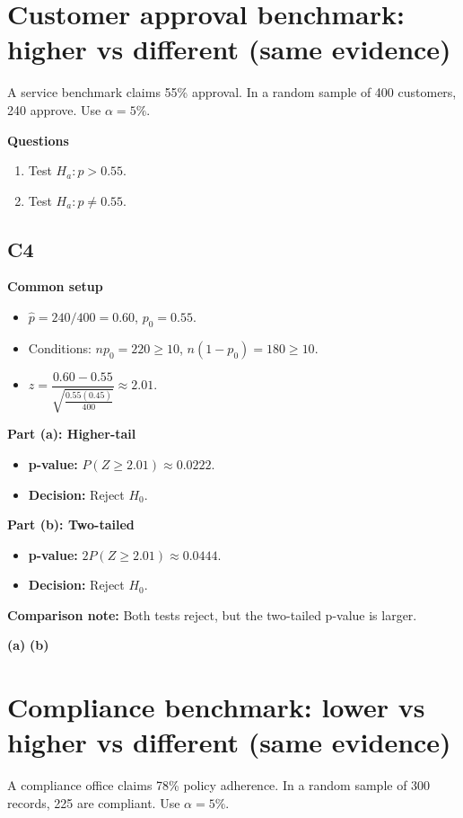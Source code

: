 \section{Customer approval benchmark: higher vs different (same evidence)}
A service benchmark claims 55\% approval. In a random sample of 400 customers, 240 approve. Use \(\alpha=5\%\).

\textbf{Questions}
\begin{enumerate}
    \item[(a)] Test \(H_a\colon p>0.55\).
    \item[(b)] Test \(H_a\colon p\ne0.55\).
\end{enumerate}

\subsection*{C4}
\textbf{Common setup}
\begin{itemize}
    \item \(\hat p=240/400=0.60\), \(p_0=0.55\).
    \item Conditions: \(np_0=220\ge10\), \(n(1-p_0)=180\ge10\).
    \item \(z=\dfrac{0.60-0.55}{\sqrt{\frac{0.55(0.45)}{400}}}\approx 2.01\).
\end{itemize}

\textbf{Part (a): Higher-tail}
\begin{itemize}
    \item \textbf{p-value:} \(P(Z\ge 2.01)\approx 0.0222\).
    \item \textbf{Decision:} Reject \(H_0\).
\end{itemize}

\textbf{Part (b): Two-tailed}
\begin{itemize}
    \item \textbf{p-value:} \(2P(Z\ge 2.01)\approx 0.0444\).
    \item \textbf{Decision:} Reject \(H_0\).
\end{itemize}

\textbf{Comparison note:} Both tests reject, but the two-tailed p-value is larger.

\begin{center}
\textbf{(a)}\;
\hspace{0.8cm}
\textbf{(b)}\;
\end{center}


\section{Compliance benchmark: lower vs higher vs different (same evidence)}
A compliance office claims 78\% policy adherence. In a random sample of 300 records, 225 are compliant. Use \(\alpha=5\%\).

